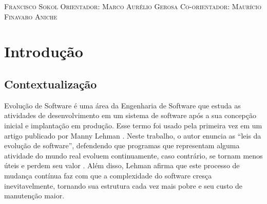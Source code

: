 \documentclass[a4paper, 12pt, twoside]{book}
\begin{document}
\begin{titlepage}
\vspace*{\fill}
\vspace{-5cm}
\vspace{2cm}
\center\textsc{{\Large Francisco Sokol}}
\vspace{1cm}
\center\textsc{{\large Orientador: Marco Aurélio Gerosa}}
\center\textsc{{\large Co-orientador: Maurício Finavaro Aniche}}
\vfill
\end{titlepage}


\pagestyle{plain}
\setcounter{page}{1} 
\tableofcontents

\newpage

\setcounter{page}{1}

\chapter{Introdução}

    \section{Contextualização}
        Evolução de Software é uma área da Engenharia de Software que estuda as atividades de desenvolvimento
        em um sistema de software após a sua concepção inicial e implantação em produção. Esse termo foi 
        usado pela primeira vez em um artigo publicado por Manny Lehman \cite{DBLP:series/springer/Mens08}. 
        Neste trabalho, o autor enuncia as ``leis da evolução de software'', defendendo que programas que 
        representam alguma atividade do mundo real evoluem continuamente, caso contrário, se tornam
        menos úteis e perdem seu valor \cite{Lehman1980b}. Além disso, Lehman afirma que este processo 
        de mudança contínua faz com que a complexidade do software cresça inevitavelmente, tornando sua 
        estrutura cada vez mais pobre e seu custo de manutenção maior.
        
\end{document}
